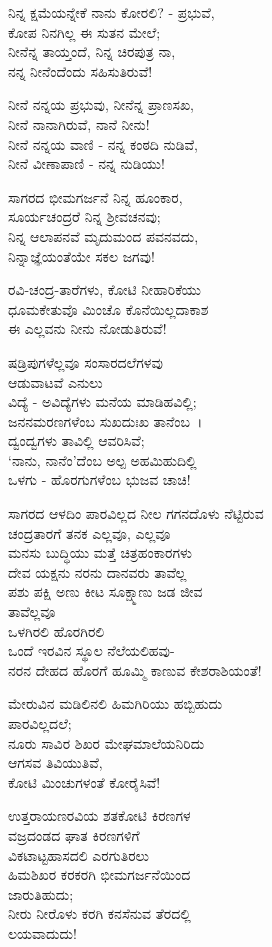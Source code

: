 ನಿನ್ನ ಕ್ಷಮೆಯನ್ನೇಕೆ ನಾನು ಕೋರಲಿ? - ಪ್ರಭುವೆ,\\ಕೋಪ ನಿನಗಿಲ್ಲ ಈ ಸುತನ ಮೇಲೆ;\\ನೀನೆನ್ನ ತಾಯ್ತಂದೆ, ನಿನ್ನ ಚಿರಪುತ್ರ ನಾ,\\ನನ್ನ ನೀನೆಂದೆಂದು ಸಹಿಸುತಿರುವೆ!

ನೀನೆ ನನ್ನಯ ಪ್ರಭುವು, ನೀನೆನ್ನ ಪ್ರಾಣಸಖ,\\ನೀನೆ ನಾನಾಗಿರುವೆ, ನಾನೆ ನೀನು!\\ನೀನೆ ನನ್ನಯ ವಾಣಿ - ನನ್ನ ಕಂಠದಿ ನುಡಿವೆ,\\ನೀನೆ ವೀಣಾಪಾಣಿ - ನನ್ನ ನುಡಿಯು!

ಸಾಗರದ ಭೀಮಗರ್ಜನೆ ನಿನ್ನ ಹೂಂಕಾರ,\\ಸೂರ್ಯಚಂದ್ರರೆ ನಿನ್ನ ಶ‍್ರೀವಚನವು;\\ನಿನ್ನ ಆಲಾಪನವೆ ಮೃದುಮಂದ ಪವನವದು,\\ನಿನ್ನಾಜ್ಞೆಯಂತೆಯೇ ಸಕಲ ಜಗವು!

ರವಿ-ಚಂದ್ರ-ತಾರೆಗಳು, ಕೋಟಿ ನೀಹಾರಿಕೆಯು\\ಧೂಮಕೇತುವೊ ಮಿಂಚೊ ಕೊನೆಯಿಲ್ಲದಾಕಾಶ\\ಈ ಎಲ್ಲವನು ನೀನು ನೋಡುತಿರುವೆ!

ಷಡ್ರಿಪುಗಳೆಲ್ಲವೂ ಸಂಸಾರದಲೆಗಳವು\\ಆಡುವಾಟವೆ ಎನುಲು\\ವಿದ್ಯೆ - ಅವಿದ್ಯೆಗಳು ಮನೆಯ ಮಾಡಿಹವಿಲ್ಲಿ;\\ಜನನಮರಣಗಳೆಂಬ ಸುಖದುಃಖ ತಾನೆಂಬ~।\\
 ದ್ವಂದ್ವಗಳು ತಾವಿಲ್ಲಿ ಆವರಿಸಿವೆ;\\‘ನಾನು, ನಾನೆಂ’ದೆಂಬ ಅಲ್ಪ ಅಹಮಿಹುದಿಲ್ಲಿ\\ಒಳಗು - ಹೊರಗುಗಳೆಂಬ ಭುಜವ ಚಾಚಿ!

ಸಾಗರದ ಆಳದಿಂ ಪಾರವಿಲ್ಲದ ನೀಲ ಗಗನದೊಳು ನೆಟ್ಟಿರುವ\\ಚಂದ್ರತಾರಗೆ ತನಕ ಎಲ್ಲವೂ, ಎಲ್ಲವೂ\\ಮನಸು ಬುದ್ಧಿಯು ಮತ್ತೆ ಚಿತ್ರಹಂಕಾರಗಳು\\ದೇವ ಯಕ್ಷನು ನರನು ದಾನವರು ತಾವೆಲ್ಲ\\ಪಶು ಪಕ್ಷಿ ಅಣು ಕೀಟ ಸೂಕ್ಷ್ಮಾಣು ಜಡ ಜೀವ\\ತಾವೆಲ್ಲವೂ\\ಒಳಗಿರಲಿ ಹೊರಗಿರಲಿ\\ಒಂದೆ ಇರವಿನ ಸ್ಥೂಲ ನೆಲೆಯಲಿಹವು-\\ನರನ ದೇಹದ ಹೊರಗೆ ಹೂಮ್ಮಿ ಕಾಣುವ ಕೇಶರಾಶಿಯಂತೆ!

ಮೇರುವಿನ ಮಡಿಲಿನಲಿ ಹಿಮಗಿರಿಯು ಹಬ್ಬಿಹುದು\\ಪಾರವಿಲ್ಲದಲೆ;\\ನೂರು ಸಾವಿರ ಶಿಖರ ಮೇಘಮಾಲೆಯನಿರಿದು\\ಆಗಸವ ತಿವಿಯುತಿವೆ,\\ಕೋಟಿ ಮಿಂಚುಗಳಂತೆ ಕೋರೈಸಿವೆ!

ಉತ್ತರಾಯಣರವಿಯ ಶತಕೋಟಿ ಕಿರಣಗಳ\\ವಜ್ರದಂಡದ ಘಾತ ಕಿರಣಗಳಿಗೆ\\ವಿಕಟಾಟ್ಟಹಾಸದಲಿ ಎರಗುತಿರಲು\\ಹಿಮಶಿಖರ ಕರಕರಗಿ ಭೀಮಗರ್ಜನೆಯಿಂದ\\ಜಾರುತಿಹುದು;\\ನೀರು ನೀರೊಳು ಕರಗಿ ಕನಸೆನುವ ತೆರದಲ್ಲಿ\\ಲಯವಾದುದು!

